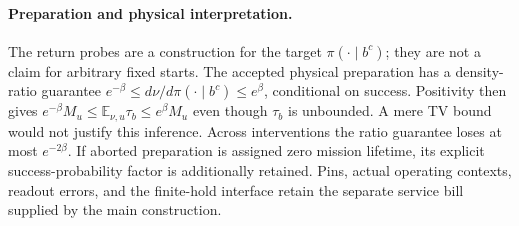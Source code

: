 \paragraph{Preparation and physical interpretation.}
The return probes are a construction for the target
$\pi(\cdot\mid b^c)$; they are not a claim for arbitrary fixed starts.
The accepted physical preparation has a density-ratio guarantee
$e^{-\beta}\le d\nu/d\pi(\cdot\mid b^c)\le e^{\beta}$, conditional on
success.  Positivity then gives
$e^{-\beta}M_u\le\mathbb E_{\nu,u}\tau_b\le e^{\beta}M_u$ even though
$\tau_b$ is unbounded.  A mere TV bound would not justify this inference.
Across interventions the ratio guarantee loses at most $e^{-2\beta}$.
If aborted preparation is assigned zero mission lifetime, its explicit
success-probability factor is additionally retained.  Pins, actual
operating contexts, readout errors, and the finite-hold interface retain
the separate service bill supplied by the main construction.
